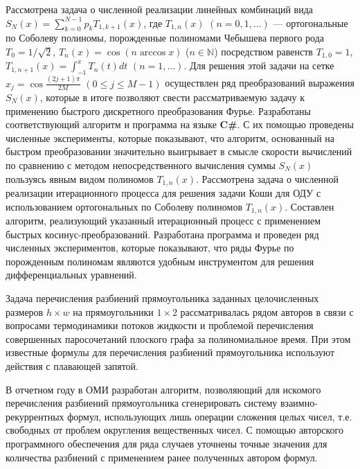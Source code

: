 Рассмотрена задача о численной реализации линейных комбинаций вида  $S_N(x) =\sum\nolimits_{k=0}^{N-1}p_kT_{1,k+1}(x)$, где
$T_{1,n}(x)$ $(n=0,1,\ldots)$ --- ортогональные по Соболеву полиномы, порожденные полиномами Чебышева первого рода $T_{0} = 1 / \sqrt{2}$, $T_{n}(x)=\cos( n\arccos x)$ ($n \in \mathbb{N}$) посредством
равенств $T_{1,0}=1$, $T_{1,n+1}(x) =\int_{-1}^x T_{n}(t)dt$ $(n=1,\ldots)$.
Для решения этой задачи на сетке $x_j=\cos\frac{(2j+1)\pi}{2M}$ $(0\le j\le M-1)$  осуществлен ряд преобразований выражения $S_N(x)$,
которые в итоге позволяют свести рассматриваемую задачу к применению быстрого дискретного преобразования Фурье.
Разработаны соответствующий алгоритм и программа на языке \textbf{C\#}.
С их помощью проведены численные эксперименты, которые показывают, что алгоритм, основанный на быстром преобразовании
значительно выигрывает в смысле скорости вычислений по сравнению с методом непосредственного вычисления суммы $S_N(x)$ пользуясь явным видом полиномов $T_{1,n}(x)$.
Рассмотрена задача о численной реализации итерационного процесса для решения задачи Коши для ОДУ с использованием ортогональных по Соболеву полиномов $T_{1,n}(x)$. Составлен алгоритм, реализующий указанный итерационный процесс с применением быстрых косинус-преобразований. Разработана программа и проведен ряд численных экспериментов, которые показывают, что ряды Фурье по порожденным полиномам являются удобным инструментом для решения дифференциальных уравнений.






Задача перечисления разбиений прямоугольника заданных целочисленных размеров $h\times w$ на прямоугольники $1\times 2$ рассматривалась рядом авторов в связи с вопросами термодинамики потоков жидкости и проблемой перечисления совершенных паросочетаний плоского графа за полиномиальное время.
При этом известные формулы для перечисления разбиений прямоугольника используют действия с плавающей запятой.


В отчетном году в ОМИ разработан алгоритм, позволяющий для искомого перечисления разбиений прямоугольника сгенерировать систему взаимно-рекуррентных формул, использующих лишь операции сложения целых чисел, т.е. свободных от проблем округления вещественных чисел.
С помощью авторского программного обеспечения для ряда случаев уточнены точные значения для количества разбиений с
применением ранее полученных автором формул.


